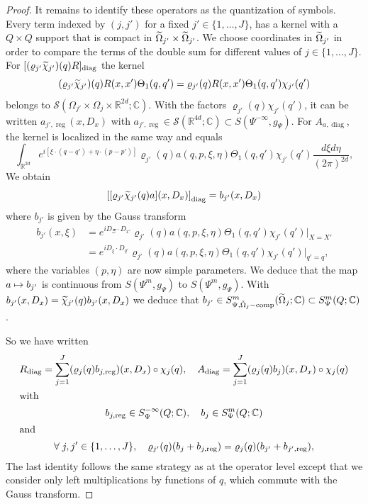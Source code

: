 \documentclass[10pt]{amsart}
\theoremstyle{definition}\newtheorem{defi}[theo]{Definition}\newtheorem{rema}[theo]{Remark}\newtheorem{exam}[theo]{Example}\newtheorem{exem}[theo]{Example}\newtheorem{nota}[theo]{Notation}
\newcommand{\C}{\mathbb{C}}
\newcommand{\R}{\mathbb{R}}
\newcommand{\clS}{\mathcal{S}}
\DeclareMathOperator{\ccomp}{comp}
\DeclareMathOperator{\diag}{diag}
\DeclareMathOperator{\reg}{reg}
\let\oldtilde\tilde
\renewcommand*{\tilde}[1]{\mathchoice{\widetilde{#1}}{\widetilde{#1}}{\oldtilde{#1}}{\oldtilde{#1}}}
\let\oldforall\forall
\renewcommand*{\forall}{\mathrel{\oldforall}}
\let\originalleft\left
\let\originalright\right
\renewcommand{\left}{\mathopen{}\mathclose\bgroup\originalleft}
\renewcommand{\right}{\aftergroup\egroup\originalright}
\let\oldmapsto\mapsto
\renewcommand*{\mapsto}{\mathchoice{\longmapsto}{\oldmapsto}{\oldmapsto}{\oldmapsto}}
\begin{document}
\begin{proof}
It remains to identify these operators as the quantization of symbols. Every term indexed by $(j,j')$ for a fixed $j'\in \{1,\dots,J\}$, has a kernel with a $Q\times Q$ support that is compact in $\tilde{\Omega}_{j'}\times\tilde{\Omega}_{j'}$. We choose coordinates in $\tilde{\Omega}_{j'}$ in order to compare the terms of the double sum for different values of $j\in \{1,\dots,J\}$. For $[(\varrho_{j'}\tilde{\chi}_{j'})(q)R]_{\diag}$ the kernel
\[
(\varrho_{j'}\tilde{\chi}_{j'})(q)R(x,x')\Theta_{1}(q,q')=\varrho_{j'}(q)R(x,x')\Theta_{1}(q,q')\chi_{j'}(q')
\]
belongs to $\clS(\Omega_{j'}\times \Omega_{j}\times \R^{2d};\C)$. With the factors $\varrho_{j'}(q)\chi_{j'}(q')$, it can be written $a_{j',\reg}(x,D_{x})$ with $a_{j',\reg}\in \clS(\R^{4d};\C)\subset S(\Psi^{-\infty},g_{\Psi})$.
For $A_{a,\diag}$, the kernel is localized in the same way and equals
\[
\int_{\R^{2d}}e^{i[\xi\cdot(q-q')+\eta\cdot(p-p')]}\varrho_{j'}(q)a(q,p,\xi,\eta)\Theta_{1}(q,q')\chi_{j'}(q')\frac{d\xi d\eta}{(2\pi)^{2d}},
\]
We obtain
\[
\left[[\varrho_{j'}\tilde{\chi}_{j'}(q)a](x,D_{x})\right]_{\diag}=b_{j'}(x,D_{x})
\]
where $b_{j'}$ is given by the Gauss transform
\begin{align*}
b_{j'}(x,\xi)&=e^{iD_{\Xi}\cdot D_{x'}}\varrho_{j'}(q)a(q,p,\xi,\eta)\Theta_{1}(q,q')\chi_{j'}(q')\big|_{X=X'}\\
&=e^{iD_{\xi}\cdot D_{q'}}\varrho_{j'}(q)a(q,p,\xi,\eta)\Theta_{1}(q,q')\chi_{j'}(q')\big|_{q'=q},
\end{align*}
where the variables $(p,\eta)$ are now simple parameters. We deduce that the map $a\mapsto b_{j'}$ is continuous from $S(\Psi^{m},g_{\Psi})$ to $S(\Psi^{m},g_{\Psi})$. With $b_{j'}(x,D_{x})=\tilde{\chi}_{j'}(q)b_{j'}(x,D_{x})$ we deduce that $b_{j'}\in S^{m}_{\Psi,\tilde{\Omega}_{j}-\ccomp}(\tilde{\Omega}_{j};\C)\subset S^{m}_{\Psi}(Q;\C)$.

So we have written
\begin{gather*}
 R_{\diag}=\sum_{j=1}^{J} (\varrho_{j}(q)b_{j,\reg})(x,D_{x})\circ \chi_{j}(q),\quad A_{\diag}=\sum_{j=1}^{J}(\varrho_{j}(q)b_{j})(x,D_{x})\circ \chi_{j}(q)\\
\intertext{with} b_{j,\reg}\in S^{-\infty}_{\Psi}(Q;\C),\quad b_{j}\in S^{m}_{\Psi}(Q;\C)\\
\intertext{and}
\forall j,j'\in \left\{1,\dots,J\right\},\quad
\varrho_{j'}(q)(b_{j}+b_{j,\reg})=\varrho_{j}(q)(b_{j'}+b_{j',\reg}),
\end{gather*}
The last identity follows the same strategy as at the operator level except that we consider only left multiplications by functions of $q$, which commute with the Gauss transform.
\end{proof}
\end{document}
